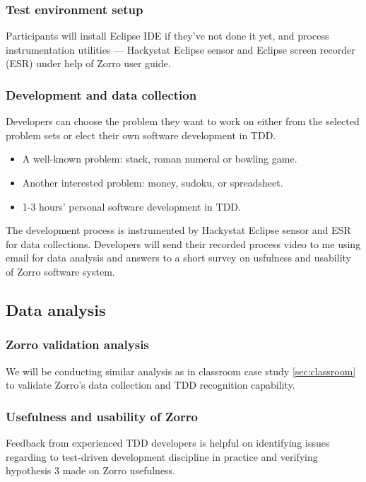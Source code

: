 \subsubsection{Test environment setup}
Participants will install Eclipse IDE if they've not done it yet, and
process instrumentation utilities --- Hackystat Eclipse sensor and Eclipse
screen recorder (ESR) under help of Zorro user guide\cite{ZorroUserGuide}.

\subsubsection{Development and data collection}
Developers can choose the problem they want to work on either from the
selected problem sets or elect their own software development in TDD.
\begin{itemize}
\item A well-known problem: stack, roman numeral or bowling game.
\item Another interested problem: money, sudoku, or spreadsheet.
\item 1-3 hours' personal software development in TDD.
\end{itemize}
The development process is instrumented by Hackystat Eclipse sensor and ESR
for data collections. Developers will send their recorded process video to
me using email for data analysis and answers to a short survey on usfulness
and usability of Zorro software system.

\subsection{Data analysis}
\subsubsection{Zorro validation analysis} 
We will be conducting similar analysis as in classroom case study
\ref{sec:classroom} to validate Zorro's data collection and TDD recognition
capability.

\subsubsection{Usefulness and usability of Zorro}
Feedback from experienced TDD developers is helpful on identifying issues
regarding to test-driven development discipline in practice and verifying
hypothesis 3 made on Zorro usefulness.




